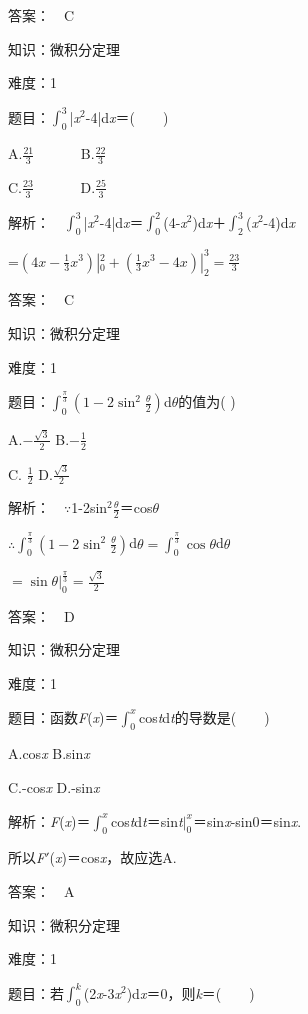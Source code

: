 \documentclass{article} %
\begin{document}
 答案：　C



 知识：微积分定理

 难度：1

 题目：$\int_0^3$|\textit{x}${}^{2}$-4|d\textit{x}＝(　　)

A.$\frac{21}{3}$　　　     B.$\frac{22}{3}$

C.$\frac{23}{3}$　　　     D.$\frac{25}{3}$

 解析：　$\int_{0}^{3}$|\textit{x}${}^{2}$-4|d\textit{x}＝$\int_0^2$(4-\textit{x}${}^{2}$)d\textit{x}＋$\int_2^3$(\textit{x}${}^{2}$-4)d\textit{x}

=$(4x-\frac{1}{3}x^3)|_0^2+(\frac{1}{3}x^3-4x)|_2^3=\frac{23}{3}$

 答案：　C



 知识：微积分定理

 难度：1

 题目：$\int_0^{\frac{\pi}{3}}(1-2\sin^2 \frac{\theta}{2})$d$\theta$的值为(    )

A.$-\frac{\sqrt{3}}{2}$       B.$-\frac{1}{2}$

C. $\frac{1}{2}$       D.$\frac{\sqrt{3}}{2}$

 解析：　$\mathrm{\because}$1-2sin${}^{2}\frac{\theta}{2}$＝cos\textit{$\theta$}

$\therefore\int_0^{\frac{\pi}{3}}(1-2\sin^2\frac{\theta}{2})$d$\theta=\int_0^{\frac{\pi}{3}}\cos\theta$d$\theta$

$=\sin\theta|_0^{\frac{\pi}{3}}=\frac{\sqrt{3}}{2}$

 答案：　D



 知识：微积分定理

 难度：1

 题目：函数\textit{F}(\textit{x})＝$\int_0^x$cos\textit{t}d\textit{t}的导数是(　　)

A.cos\textit{x}       B.sin\textit{x}

C.-cos\textit{x}       D.-sin\textit{x}

 解析：\textit{F}(\textit{x})＝$\int_0^x$cos\textit{t}d\textit{t}＝sin\textit{t}$|_0^x$＝sin\textit{x}-sin0＝sin\textit{x}.

所以\textit{F}$'$(\textit{x})＝cos\textit{x}，故应选A.

 答案：　A



 知识：微积分定理

 难度：1

 题目：若$\int_0^k$(2\textit{x}-3\textit{x}${}^{2}$)d\textit{x}＝0，则\textit{k}＝(　　)
\end{document}
